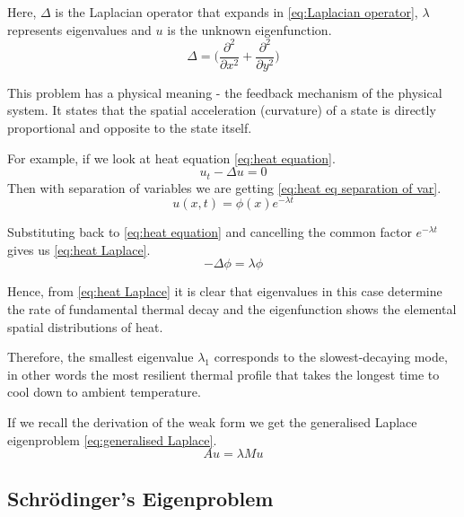 \documentclass[acmsmall,screen]{MapleTrans}
\begin{document}
Here, $\Delta$ is the Laplacian operator that expands in \eqref{eq:Laplacian operator}, $\lambda$ represents eigenvalues and $u$ is the unknown eigenfunction.
\begin{equation}
    \Delta = \Bigg(\frac{\partial^2}{\partial x^2} + \frac{\partial^2}{\partial y^2}\Bigg)
    \label{eq:Laplacian operator}
\end{equation}

This problem has a physical meaning - the feedback mechanism of the physical system. It states that the spatial acceleration (curvature) of a state is directly proportional and opposite to the state itself.

For example, if we look at heat equation \eqref{eq:heat equation}.
\begin{equation}
    u_t - \Delta u = 0
    \label{eq:heat equation}
\end{equation}
Then with separation of variables we are getting \eqref{eq:heat eq separation of var}.
\begin{equation}
    u(x, t) = \phi(x)e^{-\lambda t}
    \label{eq:heat eq separation of var}
\end{equation}

Substituting back to \eqref{eq:heat equation} and cancelling the common factor $e^{-\lambda t}$ gives us \eqref{eq:heat Laplace}.
\begin{equation}
    -\Delta\phi = \lambda\phi
    \label{eq:heat Laplace}
\end{equation}

Hence, from \eqref{eq:heat Laplace} it is clear that eigenvalues in this case determine the rate of fundamental thermal decay and the eigenfunction shows the elemental spatial distributions of heat.

Therefore, the smallest eigenvalue $\lambda_1$ corresponds to the slowest-decaying mode, in other words the most resilient thermal profile that takes the longest time to cool down to ambient temperature.

If we recall the derivation of the weak form we get the generalised Laplace eigenproblem \eqref{eq:generalised Laplace}.
\begin{equation}
    Au = \lambda Mu
    \label{eq:generalised Laplace}
\end{equation}


\subsection{Schr\"{o}dinger's Eigenproblem}
\end{document}
